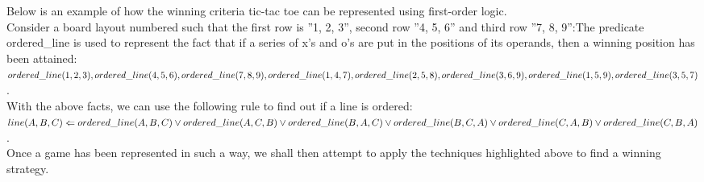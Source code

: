 \documentclass[11pt]{article}
\begin{document}
Below is an example of how the winning criteria tic-tac toe can be represented using first-order logic. \\
Consider a board layout numbered such that the first row is ''1, 2, 3'', second row ''4, 5, 6'' and third row ''7, 8, 9'':The predicate ordered\_line is used to represent the fact that if a series of x's and o's are put in the positions of its operands, then a winning position has been attained:\\
$ordered\_line(1, 2, 3), ordered\_line(4, 5, 6), ordered\_line(7, 8, 9), ordered\_line(1, 4, 7), \\ordered\_line(2, 5, 8), ordered\_line(3, 6, 9), ordered\_line(1, 5, 9), ordered\_line(3, 5, 7)$.\\
 With the above facts, we can use the following rule to find out if a line is ordered:\\
$line(A, B, C) \Leftarrow ordered\_line(A, B, C) \lor ordered\_line(A, C, B) \lor ordered\_line(B, A, C)\\ \lor ordered\_line(B, C, A) \lor ordered\_line(C, A, B) \lor ordered\_line(C, B, A) $.\\

Once a game has been represented in such a way, we shall then attempt to apply the techniques highlighted above to find a winning strategy.



\end{document}
